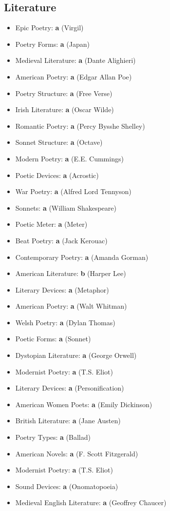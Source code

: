 \documentclass[12pt,a4paper]{book}
\begin{document}
\subsection{Literature}
\begin{itemize}
\item Epic Poetry: \textbf{a} (Virgil)
\item Poetry Forms: \textbf{a} (Japan)
\item Medieval Literature: \textbf{a} (Dante Alighieri)
\item American Poetry: \textbf{a} (Edgar Allan Poe)
\item Poetry Structure: \textbf{a} (Free Verse)
\item Irish Literature: \textbf{a} (Oscar Wilde)
\item Romantic Poetry: \textbf{a} (Percy Bysshe Shelley)
\item Sonnet Structure: \textbf{a} (Octave)
\item Modern Poetry: \textbf{a} (E.E. Cummings)
\item Poetic Devices: \textbf{a} (Acrostic)
\item War Poetry: \textbf{a} (Alfred Lord Tennyson)
\item Sonnets: \textbf{a} (William Shakespeare)
\item Poetic Meter: \textbf{a} (Meter)
\item Beat Poetry: \textbf{a} (Jack Kerouac)
\item Contemporary Poetry: \textbf{a} (Amanda Gorman)
\item American Literature: \textbf{b} (Harper Lee)
\item Literary Devices: \textbf{a} (Metaphor)
\item American Poetry: \textbf{a} (Walt Whitman)
\item Welsh Poetry: \textbf{a} (Dylan Thomas)
\item Poetic Forms: \textbf{a} (Sonnet)
\item Dystopian Literature: \textbf{a} (George Orwell)
\item Modernist Poetry: \textbf{a} (T.S. Eliot)
\item Literary Devices: \textbf{a} (Personification)
\item American Women Poets: \textbf{a} (Emily Dickinson)
\item British Literature: \textbf{a} (Jane Austen)
\item Poetry Types: \textbf{a} (Ballad)
\item American Novels: \textbf{a} (F. Scott Fitzgerald)
\item Modernist Poetry: \textbf{a} (T.S. Eliot)
\item Sound Devices: \textbf{a} (Onomatopoeia)
\item Medieval English Literature: \textbf{a} (Geoffrey Chaucer)
\end{itemize}
\end{document}
